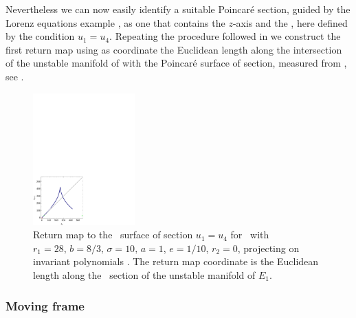 Nevertheless we can now easily identify a suitable Poincar\'e section, guided
by the Lorenz equations example , as one that contains the $z$-axis and the \reqv,
here defined by the condition $u_1=u_4$. Repeating the procedure followed in 
we construct the first return map using as coordinate the Euclidean length along the intersection
of the unstable manifold of  with the Poincar\'e surface of section, measured from , see .


\begin{figure}[ht]
\begin{center}
\includegraphics[width=0.35\textwidth]{../figs/CLEipRM}
\end{center}
\caption[Return map for Complex Lorenz flow, invariant polynomials]{Return map to the \Poincare\
surface of section $u_1=u_4$ for \CLe\ with $r_1=28,\, b=8/3,\, \sigma=10,\, a=1$, $e=1/10$, $r_2=0$,
projecting on invariant polynomials \refeq{eq:ipLaser}.
The return map coordinate is the Euclidean
length along the \Poincare\ section of the unstable manifold of $E_1$.
    }
\label{fig:CLEipRM}
\end{figure}

\subsubsection{Moving frame}
\label{sec:CLeMF}


